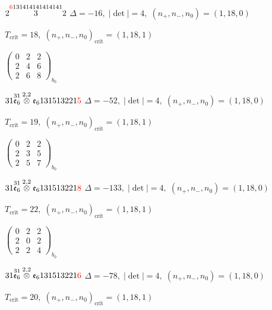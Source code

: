 \documentclass[10pt]{article}
\begin{document}
\smallskip

$2\overset{\textcolor{red}{6}131414141414141}{3}2$ \quad $\Delta=-16,\; |\det|=4,\; (n_+,n_-,n_0)=(1,18,0)$

\hspace{1em}$T_{\text{crit}}=18,\; (n_+,n_-,n_0)_{\text{crit}}=(1,18,1)$

\hspace{2em}$\left(\begin{smallmatrix}0 & 2 & 2 \\ 2 & 4 & 6 \\ 2 & 6 & 8\end{smallmatrix}\right)_{\!b_0}$

\smallskip

$31\overset{31}{\mathfrak{e}_6}\overset{2,2}{\otimes}\mathfrak{e}_6131513221\textcolor{red}{5}$ \quad $\Delta=-52,\; |\det|=4,\; (n_+,n_-,n_0)=(1,18,0)$

\hspace{1em}$T_{\text{crit}}=19,\; (n_+,n_-,n_0)_{\text{crit}}=(1,18,1)$

\hspace{2em}$\left(\begin{smallmatrix}0 & 2 & 2 \\ 2 & 3 & 5 \\ 2 & 5 & 7\end{smallmatrix}\right)_{\!b_0}$

$31\overset{31}{\mathfrak{e}_6}\overset{2,2}{\otimes}\mathfrak{e}_6131513221\textcolor{red}{8}$ \quad $\Delta=-133,\; |\det|=4,\; (n_+,n_-,n_0)=(1,18,0)$

\hspace{1em}$T_{\text{crit}}=22,\; (n_+,n_-,n_0)_{\text{crit}}=(1,18,1)$

\hspace{2em}$\left(\begin{smallmatrix}0 & 2 & 2 \\ 2 & 0 & 2 \\ 2 & 2 & 4\end{smallmatrix}\right)_{\!b_0}$

$31\overset{31}{\mathfrak{e}_6}\overset{2,2}{\otimes}\mathfrak{e}_6131513221\textcolor{red}{6}$ \quad $\Delta=-78,\; |\det|=4,\; (n_+,n_-,n_0)=(1,18,0)$

\hspace{1em}$T_{\text{crit}}=20,\; (n_+,n_-,n_0)_{\text{crit}}=(1,18,1)$
\end{document}

